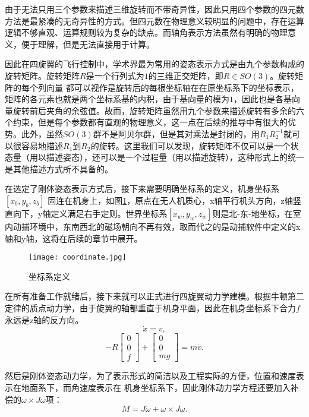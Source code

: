 由于无法只用三个参数来描述三维旋转而不带奇异性，因此只用四个参数的四元数方法是最紧凑的无奇异性的方式。但四元数在物理意义较明显的问题中，存在运算逻辑不够直观、运算规则较为复杂的缺点。而轴角表示方法虽然有明确的物理意义，便于理解，但是无法直接用于计算。

因此在四旋翼的飞行控制中，学术界最为常用的姿态表示方式是由九个参数构成的旋转矩阵。旋转矩阵$R$是一个行列式为$1$的三维正交矩阵，即$R\in SO(3)$。旋转矩阵的每个列向量  都可以视作是旋转后的每根坐标轴在在原坐标系下的坐标表示，矩阵的各元素也就是两个坐标系基的内积，由于基向量的模为$1$，因此也是各基向量旋转前后夹角的余弦值。故而，旋转矩阵虽然用九个参数来描述旋转有多余的六个约束，但是每个参数都有直观的物理意义，这一点在后续的推导中有很大的优势。此外，虽然$SO(3)$群不是阿贝尔群，但是其对乘法是封闭的，用$R_1R_2^{-1}$就可以很容易地描述$R_1$到$R_2$的旋转。这里我们可以发现，旋转矩阵不仅可以是一个状态量（用以描述姿态），还可以是一个过程量（用以描述旋转），这种形式上的统一是其他描述方式所不具备的。

在选定了刚体姿态表示方式后，接下来需要明确坐标系的定义，机身坐标系$[x_b,y_b,z_b]$ 固连在机身上，如图\ref{fig:1}，原点在无人机质心，x轴平行机头方向，z轴竖直向下，y轴定义满足右手定则。世界坐标系$[x_w,y_w,z_w]$则是北-东-地坐标，在室内动捕环境中，东南西北的磁场朝向不再有效，取而代之的是动捕软件中定义的x轴和y轴，这将在后续的章节中展开。
\begin{figure}[!h]
    \centering
    \texttt{[image: coordinate.jpg]}
    \caption{坐标系定义}
    \label{fig:1}
  \end{figure}

在所有准备工作就绪后，接下来就可以正式进行四旋翼动力学建模。根据牛顿第二定律的质点动力学，由于旋翼的轴都垂直于机身平面，因此在机身坐标系下合力$f$永远是z轴的反方向。
  \begin{equation}
    \dot x=v,
  \end{equation}
  \begin{equation}
    -R \begin{bmatrix} 0\\ 0\\ f \end{bmatrix}+\begin{bmatrix} 0\\ 0\\ mg\end{bmatrix}=m \dot v. 
    \label{equ:a}
  \end{equation}

然后是刚体姿态动力学，为了表示形式的简洁以及工程实际的方便，位置和速度表示在地面系下，而角速度表示在
机身坐标系下，因此刚体动力学方程还要加入补偿的$\omega \times J \omega$项：
  \begin{equation}
    M=J \dot\omega +\omega \times J \omega.
    \label{equ:M}
  \end{equation}

